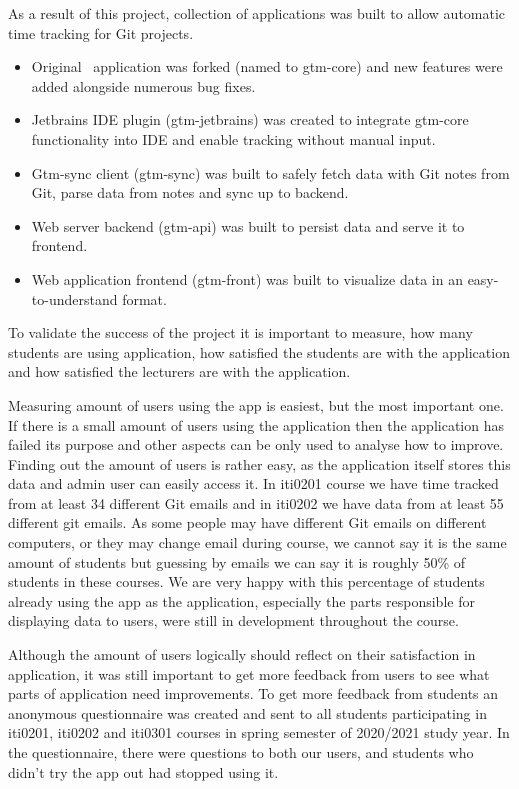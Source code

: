 As a result of this project, collection of applications was built to allow automatic time tracking for Git projects.
\begin{itemize}
    \item Original~ application was forked (named to gtm-core) and new features were added
    alongside numerous bug fixes.
    \item Jetbrains IDE plugin (gtm-jetbrains) was created to integrate gtm-core functionality into IDE and enable tracking without manual input.
    \item Gtm-sync client (gtm-sync) was built to safely fetch data with Git notes from Git, parse data from notes and sync up to backend.
    \item Web server backend (gtm-api) was built to persist data and serve it to frontend.
    \item Web application frontend (gtm-front) was built to visualize data in an easy-to-understand format.
\end{itemize}

To validate the success of the project it is important to measure, how many students are using application,
how satisfied the students are with the application and how satisfied the lecturers are with the application.

Measuring amount of users using the app is easiest, but the most important one.
If there is a small amount of users using the application then the application has failed its purpose and other
aspects can be only used to analyse how to improve.
Finding out the amount of users is rather easy, as the application itself stores this data and admin user can easily access it.
In iti0201 course we have time tracked from at least 34 different Git emails and in iti0202 we have data from at least 55 different git emails.
As some people may have different Git emails on different computers, or they may change email during course, we cannot say it
is the same amount of students but guessing by emails we can say it is roughly 50\% of students in these courses.
We are very happy with this percentage of students already using the app as the application, especially the parts
responsible for displaying data to users, were still in development throughout the course.

Although the amount of users logically should reflect on their satisfaction in application, it was still important to
get more feedback from users to see what parts of application need improvements.
To get more feedback from students an anonymous questionnaire was created and sent to all students participating in iti0201, iti0202
and iti0301 courses in spring semester of 2020/2021 study year.
In the questionnaire, there were questions to both our users, and students who didn't try the app out had stopped using it.

